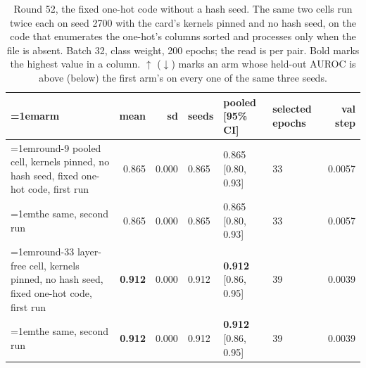 \begin{table}[H]
  \centering
  \scriptsize
  \setlength{\tabcolsep}{2.5pt}
  \caption[Round 52, the fixed one-hot code without a hash seed]{Round 52, the fixed one-hot code without a hash seed. The same two cells run twice each on seed 2700 with the card's kernels pinned and no hash seed, on the code that enumerates the one-hot's columns sorted and processes only when the file is absent. Batch 32, class weight, 200 epochs; the read is per pair. Bold marks the highest value in a column. $\uparrow$ ($\downarrow$) marks an arm whose held-out AUROC is above (below) the first arm's on every one of the same three seeds.}
  \label{tab:w68}
  \begin{tabular}{@{}>{\raggedright\hangindent=1em\hangafter=1\arraybackslash}p{99.6mm}rrlllr@{}}
    \hline
    arm & mean & sd & seeds & pooled [95\% CI] & selected epochs & val step \\
    \hline
    round-9 pooled cell, kernels pinned, no hash seed, fixed one-hot code, first run & 0.865 & 0.000 & 0.865 & 0.865 [0.80, 0.93] & 33 & 0.0057 \\
    the same, second run & 0.865 & 0.000 & 0.865 & 0.865 [0.80, 0.93] & 33 & 0.0057 \\
    round-33 layer-free cell, kernels pinned, no hash seed, fixed one-hot code, first run & \textbf{0.912} & 0.000 & 0.912 & \textbf{0.912} [0.86, 0.95] & 39 & 0.0039 \\
    the same, second run & \textbf{0.912} & 0.000 & 0.912 & \textbf{0.912} [0.86, 0.95] & 39 & 0.0039 \\
    \hline
  \end{tabular}
\end{table}

